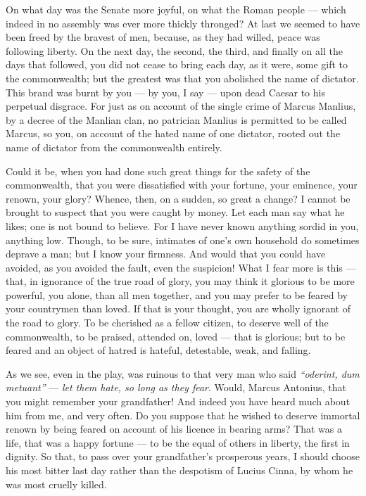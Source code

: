  On what day was the Senate more joyful, on what the Roman people --- which indeed in no assembly was ever more thickly thronged? At last we seemed to have been freed by the bravest of men, because, as they had willed, peace was following liberty. On the next day, the second, the third, and finally on all the days that followed, you did not cease to bring each day, as it were, some gift to the commonwealth; but the greatest was that you abolished the name of dictator. This brand was burnt by you --- by you, I say --- upon dead Caesar to his perpetual disgrace. For just as on account of the single crime of Marcus Manlius, by a decree of the Manlian clan, no patrician Manlius is permitted to be called Marcus, so you, on account of the hated name of one dictator, rooted out the name of dictator from the commonwealth entirely.

 Could it be, when you had done such great things for the safety of the commonwealth, that you were dissatisfied with your fortune, your eminence, your renown, your glory? Whence, then, on a sudden, so great a change? I cannot be brought to suspect that you were caught by money. Let each man say what he likes; one is not bound to believe. For I have never known anything sordid in you, anything low. Though, to be sure, intimates of one's own household do sometimes deprave a man; but I know your firmness. And would that you could have avoided, as you avoided the fault, even the suspicion! What I fear more is this --- that, in ignorance of the true road of glory, you may think it glorious to be more powerful, you alone, than all men together, and you may prefer to be feared by your countrymen than loved. If that is your thought, you are wholly ignorant of the road to glory. To be cherished as a fellow citizen, to deserve well of the commonwealth, to be praised, attended on, loved --- that is glorious; but to be feared and an object of hatred is hateful, detestable, weak, and falling.

 As we see, even in the play, was ruinous to that very man who said \textit{``oderint, dum metuant''} --- \textit{let them hate, so long as they fear}. Would, Marcus Antonius, that you might remember your grandfather! And indeed you have heard much about him from me, and very often. Do you suppose that he wished to deserve immortal renown by being feared on account of his licence in bearing arms? That was a life, that was a happy fortune --- to be the equal of others in liberty, the first in dignity. So that, to pass over your grandfather's prosperous years, I should choose his most bitter last day rather than the despotism of Lucius Cinna, by whom he was most cruelly killed.

